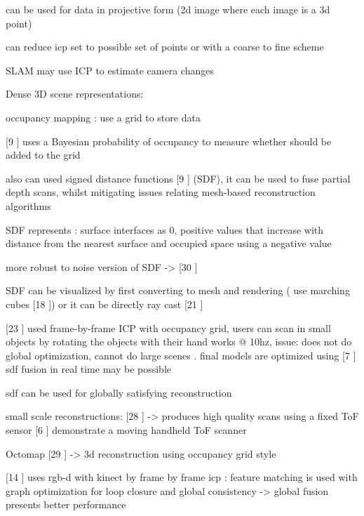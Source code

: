 can be used for data in projective form (2d image where each image is a 3d point)

can reduce icp set to possible set of points or with a coarse to fine scheme

SLAM may use ICP to estimate camera changes

Dense 3D scene representations:

occupancy mapping : use a grid to store data

[9 \cite{Elfes87Sensor}] uses a Bayesian probability of occupancy to measure whether should be added to the grid

also can used signed distance functions [9 \cite{Elfes87Sensor}] (SDF), it can be used to fuse partial depth scans, whilst mitigating
issues relating mesh-based reconstruction algorithms

SDF represents : surface interfaces as 0, positive values that increase with distance from the nearest surface
and occupied space using a negative value

more robust to noise version of SDF -> [30 \cite{Zach07Globally} ]

SDF can be visualized by first converting to mesh and rendering ( use marching cubes [18 \cite{Cubes87High}]) or it can be directly ray cast [21 \cite{Parker98Interactive}]

[23 \cite{Rusinkiewicz02Real}] used frame-by-frame ICP with occupancy grid, users can scan in small objects by rotating the objects with their hand
works @ 10hz, issue: does not do global optimization, cannot do large scenes . final models are optimized using [7 \cite{Curless96Volumetric}]
sdf fusion in real time may be possible

sdf can be used for globally satisfying reconstruction

small scale reconstructions:
	[28 \cite{Weise09Hand}] -> produces high quality scans using a fixed ToF sensor
	[6 \cite{Cui103d} ] demonstrate a moving handheld ToF scanner

Octomap [29 \cite{Wurm10Octomap}] -> 3d reconstruction using occupancy grid style 

[14 \cite{Henry10Rgb}] uses rgb-d with kinect by frame by frame icp : feature matching is used with graph optimization for loop closure and global consistency -> global fusion presents better performance








































